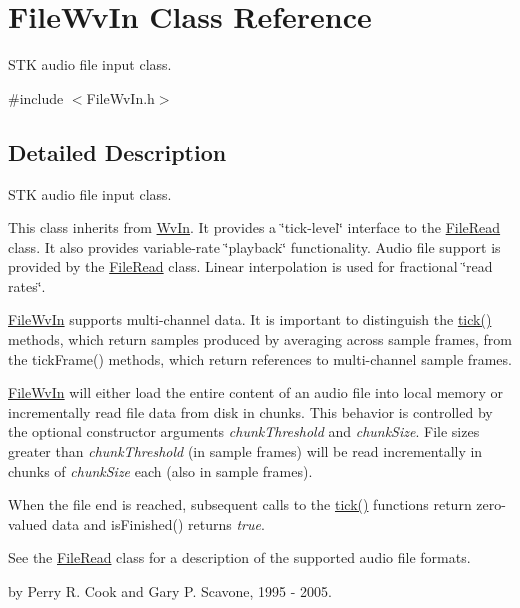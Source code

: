 \hypertarget{class_file_wv_in}{}\section{File\+Wv\+In Class Reference}
\label{class_file_wv_in}


S\+TK audio file input class.  




{\ttfamily \#include $<$File\+Wv\+In.\+h$>$}



\subsection{Detailed Description}
S\+TK audio file input class. 

This class inherits from \hyperlink{class_wv_in}{Wv\+In}. It provides a \char`\"{}tick-\/level\char`\"{} interface to the \hyperlink{class_file_read}{File\+Read} class. It also provides variable-\/rate \char`\"{}playback\char`\"{} functionality. Audio file support is provided by the \hyperlink{class_file_read}{File\+Read} class. Linear interpolation is used for fractional \char`\"{}read
rates\char`\"{}.

\hyperlink{class_file_wv_in}{File\+Wv\+In} supports multi-\/channel data. It is important to distinguish the \hyperlink{instr_8cpp_a02d20b725355812062c8b0c91b172b61}{tick()} methods, which return samples produced by averaging across sample frames, from the tick\+Frame() methods, which return references to multi-\/channel sample frames.

\hyperlink{class_file_wv_in}{File\+Wv\+In} will either load the entire content of an audio file into local memory or incrementally read file data from disk in chunks. This behavior is controlled by the optional constructor arguments {\itshape chunk\+Threshold} and {\itshape chunk\+Size}. File sizes greater than {\itshape chunk\+Threshold} (in sample frames) will be read incrementally in chunks of {\itshape chunk\+Size} each (also in sample frames).

When the file end is reached, subsequent calls to the \hyperlink{instr_8cpp_a02d20b725355812062c8b0c91b172b61}{tick()} functions return zero-\/valued data and is\+Finished() returns {\itshape true}.

See the \hyperlink{class_file_read}{File\+Read} class for a description of the supported audio file formats.

by Perry R. Cook and Gary P. Scavone, 1995 -\/ 2005.

